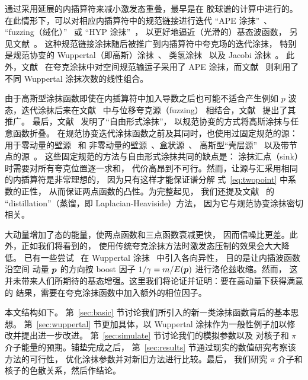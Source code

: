 通过采用延展的内插算符来减小激发态重叠，最早是在
胶球谱的计算中进行的。在此情形下，可以对相应内插算符中的规范链接进行迭代
``APE 涂抹''~\cite{Falcioni:1984ei}、
``fuzzing（绒化）''~\cite{Teper:1987wt} 或 ``HYP 涂抹''~\cite{Hasenfratz:2001hp}，
以更好地逼近（光滑的）基态波函数，
另见文献~\cite{Gupta:1990ek}。
这种规范链接涂抹随后被推广到内插算符中夸克场的迭代涂抹，
特别是规范协变的 Wuppertal（即高斯）涂抹~\cite{Gusken:1989ad,Gusken:1989qx,Alexandrou:1990dq}、
类氢涂抹~\cite{Alexandrou:1990dq}
以及 Jacobi 涂抹~\cite{Collins:1992rp,Allton:1993wc}。
此外，文献~\cite{Gusken:1989qx,Alexandrou:1990dq,Bali:2005fu}
在夸克涂抹中对空间规范输运子采用了 APE 涂抹，而文献~\cite{Bali:2005fu}
则利用了不同 Wuppertal 涂抹次数的线性组合。

由于高斯型涂抹函数即使在内插算符中加入导数之后也可能不适合产生例如
$p$ 波态，迭代涂抹后来在文献~\cite{Lacock:1994qx} 中与位移夸克源（fuzzing）
相结合，文献~\cite{Boyle:1999gx} 提出了其推广。
最后，文献~\cite{vonHippel:2013yfa} 发明了``自由形式涂抹''，
以规范协变的方式将高斯涂抹与任意函数折叠。
在规范协变迭代涂抹函数之前及其同时，也使用过固定规范的源：
用于零动量的壁源~\cite{Bacilieri:1988fh} 和
非零动量的壁源~\cite{Detmold:2012wc}、盒状源~\cite{Allton:1990qg}、
高斯型``壳层源''~\cite{DeGrand:1990dz}
以及带节点的源~\cite{DeGrand:1991ng}。
这些固定规范的方法与自由形式涂抹共同的缺点是：
涂抹汇点（sink）时需要对所有夸克位置逐一求和，
代价高昂到不可行。然而，让源与汇采用相同的内插算符是非常理想的，
因为只有这样才能保证谱分解
式~\eqref{eq:twopoint} 中系数的正性，
从而保证两点函数的凸性。为完整起见，
我们还提及文献~\cite{Peardon:2009gh} 的 ``distillation''（蒸馏，即
Laplacian-Heaviside）方法，
因为它与规范协变涂抹密切相关。

大动量增加了态的能量，使两点函数和三点函数衰减更快，
因而信噪比更差。此外，正如我们将看到的，
使用传统夸克涂抹方法时激发态压制的效果会大大降低。
已有一些尝试~\cite{Roberts:2012tp,DellaMorte:2012xc}
在 Wuppertal 涂抹~\cite{Gusken:1989ad,Gusken:1989qx} 中引入各向异性，
目的是让内插波函数沿空间
动量 $\boldsymbol{p}$ 的方向按 boost 因子 $1/\gamma=m/E(\boldsymbol{p})$
进行洛伦兹收缩。然而，
这并未带来人们所期待的基态增强。这里我们将论证并证明：要在高动量下获得满意的
结果，需要在夸克涂抹函数中加入额外的相位因子。

本文结构如下。
第~\ref{sec:basic} 节讨论我们所引入的新一类涂抹函数背后的基本思想。
第~\ref{sec:wuppertal} 节更加具体，以 Wuppertal 涂抹作为一般性例子加以修改并提出进一步改进。
第~\ref{sec:simulate} 节讨论我们的模拟参数以及
对核子和 $\pi$ 介子能量的预期。铺垫完成之后，
第~\ref{sec:results} 节通过现实的数值研究考察该方法的可行性，
优化涂抹参数并对新旧方法进行比较。最后，
我们研究 $\pi$ 介子和核子的色散关系，然后作结论。
